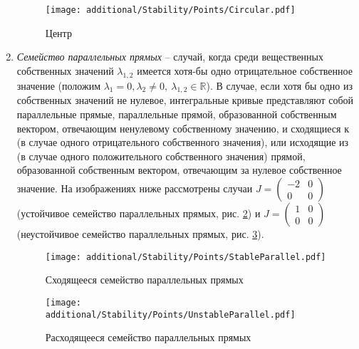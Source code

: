 \begin{enumerate}
			\begin{figure}[H]
				\centering
				\texttt{[image: additional/Stability/Points/Circular.pdf]}
				\caption{Центр}
				\label{Stability:Circular}
			\end{figure}

		\item \textit{Семейство параллельных прямых} -- случай, когда среди вещественных собственных значений $\lambda_{1, 2}$ имеется хотя-бы одно отрицательное собственное значение (положим $\lambda_1 = 0, \lambda_2 \neq 0, ~ \lambda_{1, 2} \in \mathbb{R}$). В случае, если хотя бы одно из собственных значений не нулевое, интегральные кривые представляют собой параллельные прямые, параллельные прямой, образованной собственным вектором, отвечающим ненулевому собственному значению, и сходящиеся к (в случае одного отрицательного собственного значения), или исходящие из (в случае одного положительного собственного значения) прямой, образованной собственным вектором, отвечающим за нулевое собственное значение. На изображениях ниже рассмотрены случаи $J = \begin{pmatrix} -2 & 0 \\ 0 & 0 \end{pmatrix}$ (устойчивое семейство параллельных прямых, рис. \ref{Stability:StableParallel}) и $J = \begin{pmatrix} 1 & 0 \\ 0 & 0 \end{pmatrix}$ (неустойчивое семейство параллельных прямых, рис. \ref{Stability:UnstableParallel}).

			\begin{multicols}{2}

				\begin{figure}[H]
					\centering
					\texttt{[image: additional/Stability/Points/StableParallel.pdf]}
					\caption{Сходящееся семейство параллельных прямых}
					\label{Stability:StableParallel}
				\end{figure}

			\columnbreak

				\begin{figure}[H]
					\centering
					\texttt{[image: additional/Stability/Points/UnstableParallel.pdf]}
					\caption{Расходящееся семейство параллельных прямых}
					\label{Stability:UnstableParallel}
				\end{figure}

			\end{multicols}


\end{enumerate}
